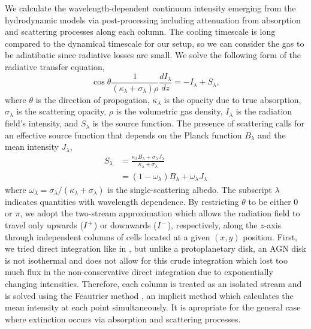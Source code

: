 We calculate the wavelength-dependent continuum intensity emerging from the hydrodynamic models via post-processing including attenuation from absorption and scattering processes along each column.
The cooling timescale is long compared to the dynamical timescale for our setup, so we can consider the gas to be adiatibatic since radiative losses are small.
We solve the following form of the radiative transfer equation,
\begin{equation}\label{eqn:RadTrans}
    \cos\theta \frac{1}{(\kappa_\lambda + \sigma_\lambda)\rho} \frac{dI_\lambda}{dz} = -I_\lambda + S_\lambda,
\end{equation}
where $\theta$ is the direction of propogation, $\kappa_\lambda$ is the opacity due to true absorption, $\sigma_\lambda$ is the scattering opacity, $\rho$ is the volumetric gas density, $I_\lambda$ is the radiation field's intensity, and $S_\lambda$ is the source function.
The presence of scattering calls for an effective source function that depends on the Planck function $B_\lambda$ and the mean intensity $J_\lambda$,
\begin{align}
    S_\lambda &= \frac{\kappa_\lambda B_\lambda + \sigma_\lambda J_\lambda}{\kappa_\lambda + \sigma_\lambda}  \nonumber\\
              &= (1-\omega_\lambda) B_{\lambda} + \omega_\lambda J_\lambda \label{eqn:effective_source}
\end{align}
where $\omega_\lambda = \sigma_\lambda / (\kappa_\lambda + \sigma_\lambda)$ is the single-scattering albedo.
The subscript $\lambda$ indicates quantities with wavelength dependence.
By restricting $\theta$ to be either 0 or $\pi$, we adopt the two-stream approximation which allows the radiation field to travel only upwards ($I^+$) or downwards ($I^-$), respectively, along the $z$-axis through independent columns of cells located at a given $(x, y)$ position.
First, we tried direct integration like in \citet{Godines+26}, but unlike a protoplanetary disk, an AGN disk is not isothermal and does not allow for this crude integration which lost too much flux in the non-conservative direct integration due to exponentially changing intensities.
Therefore, each column is treated as an isolated stream and is solved using the Feautrier method \citep{Feautrier64,Cannon70}, an implicit method which calculates the mean intensity at each point simultaneously.
It is apropriate for the general case where extinction occurs via absorption and scattering processes.

